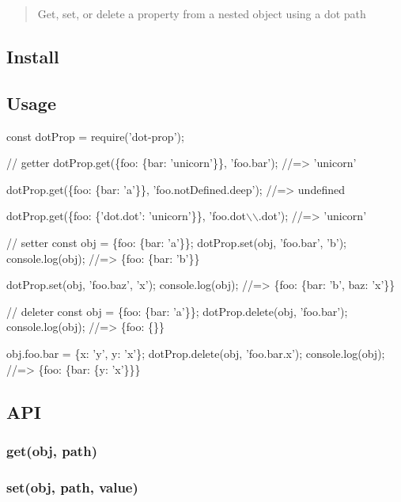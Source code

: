 \begin{quote}
Get, set, or delete a property from a nested object using a dot path \end{quote}


\subsection*{Install}




\subsection*{Usage}


\begin{DoxyCode}
const dotProp = require('dot-prop');

// getter
dotProp.get(\{foo: \{bar: 'unicorn'\}\}, 'foo.bar');
//=> 'unicorn'

dotProp.get(\{foo: \{bar: 'a'\}\}, 'foo.notDefined.deep');
//=> undefined

dotProp.get(\{foo: \{'dot.dot': 'unicorn'\}\}, 'foo.dot\(\backslash\)\(\backslash\).dot');
//=> 'unicorn'

// setter
const obj = \{foo: \{bar: 'a'\}\};
dotProp.set(obj, 'foo.bar', 'b');
console.log(obj);
//=> \{foo: \{bar: 'b'\}\}

dotProp.set(obj, 'foo.baz', 'x');
console.log(obj);
//=> \{foo: \{bar: 'b', baz: 'x'\}\}

// deleter
const obj = \{foo: \{bar: 'a'\}\};
dotProp.delete(obj, 'foo.bar');
console.log(obj);
//=> \{foo: \{\}\}

obj.foo.bar = \{x: 'y', y: 'x'\};
dotProp.delete(obj, 'foo.bar.x');
console.log(obj);
//=> \{foo: \{bar: \{y: 'x'\}\}\}
\end{DoxyCode}


\subsection*{A\+PI}

\subsubsection*{get(obj, path)}

\subsubsection*{set(obj, path, value)}

